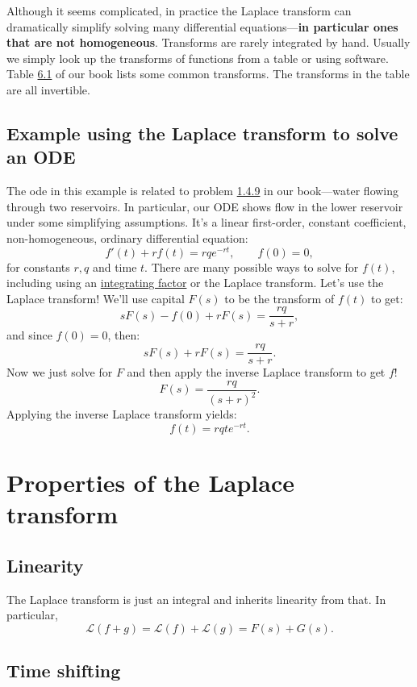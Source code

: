 \documentclass[10pt]{article}
\begin{document}
Although it seems complicated, in practice the Laplace transform can
dramatically simplify solving many differential equations---\textbf{in particular ones
that are not homogeneous}. Transforms are rarely integrated by hand. Usually we
simply look up the transforms of functions from a table or using software.
Table \href{https://www.jirka.org/diffyqs/html/laplace_section.html#lt_table}{6.1}
of our book lists some common transforms. The transforms in the table
are all invertible.

\subsection*{Example using the Laplace transform to solve an ODE}

The ode in this example is related to problem
\href{https://www.jirka.org/diffyqs/html/intfactor_section.html#intfactor_section-3-7}{1.4.9}
in our book---water flowing through two reservoirs. In particular, our
ODE shows flow in the lower reservoir under some simplifying assumptions.
It's a linear first-order, constant coefficient, non-homogeneous, ordinary differential equation:
\[
f'(t) + rf(t) = rqe^{-rt}, \qquad f(0)=0,
\]
for constants $r, q$ and time $t$.
There are many possible ways to solve for $f(t)$, including using an
\href{https://www.jirka.org/diffyqs/html/intfactor_section.html}{integrating
factor} or the Laplace transform. Let's use the Laplace transform! We'll use
capital $F(s)$ to be the transform of $f(t)$ to get:
\[
sF(s) - f(0) + rF(s) = \dfrac{rq}{s+r},
\]
and since $f(0)=0$, then:
\[
sF(s) + rF(s) = \dfrac{rq}{s + r}.
\]
Now we just solve for $F$ and then apply the inverse Laplace transform to get $f$!
\[
F(s) = \dfrac{rq}{(s + r)^2}.
\]
Applying the inverse Laplace transform yields:
\[
f(t) = rq t e^{-rt}.
\]

\section*{Properties of the Laplace transform}

\subsection*{Linearity}

The Laplace transform is just an integral and inherits linearity from that. In particular,
\[
\mathcal{L}(f + g) = \mathcal{L}(f) + \mathcal{L}(g) = F(s) + G(s).
\]

\subsection*{Time shifting}
\end{document}
